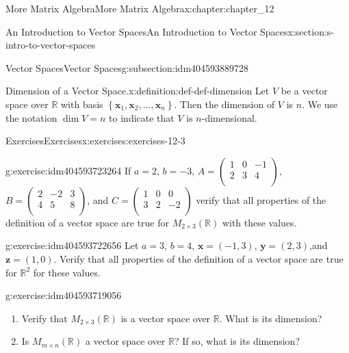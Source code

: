 \documentclass[twoside,10pt,]{book}
\numberwithin{equation}{section}
\renewcommand{\vec}[1]{\mathbf{#1}}
\begin{document}
\begin{chapterptx}{More Matrix Algebra}{}{More Matrix Algebra}{}{}{x:chapter:chapter_12}
\begin{sectionptx}{An Introduction to Vector Spaces}{}{An Introduction to Vector Spaces}{}{}{x:section:s-intro-to-vector-spaces}
\begin{subsectionptx}{Vector Spaces}{}{Vector Spaces}{}{}{g:subsection:idm404593889728}
\begin{definition}{Dimension of a Vector Space.}{x:definition:def-def-dimension}
Let \(V\) be a vector space over \(\mathbb{R}\) with basis \(\left\{\vec{x}_1,\vec{x}_2, \ldots ,\vec{x}_n\right\}\). Then the dimension of \(V\) is \(n\).   We use the notation  \(\dim  V = n\) to indicate that \(V\) is \(n\)-dimensional.%
\end{definition}
\end{subsectionptx}
%
%
\typeout{************************************************}
\typeout{************************************************}
%
\begin{exercises-subsection}{Exercises}{}{Exercises}{}{}{x:exercises:exercises-12-3}
\begin{divisionexercise}{1}{}{}{g:exercise:idm404593723264}%
If \(a = 2\), \(b = -3\), \(A=\left(
\begin{array}{ccc}
1 & 0 & -1 \\
2 & 3 & 4 \\
\end{array}
\right)\),    \(B=\left(
\begin{array}{ccc}
2 & -2 & 3 \\
4 & 5 & 8 \\
\end{array}
\right)\),  and \(C=\left(
\begin{array}{ccc}
1 & 0 & 0 \\
3 & 2 & -2 \\
\end{array}
\right)\) verify that all properties of the definition of a vector space are true for \(M_{2\times 3}(\mathbb{R})\) with these values.%
\end{divisionexercise}%
\begin{divisionexercise}{2}{}{}{g:exercise:idm404593722656}%
Let \(a = 3\), \(b = 4\), \(\vec{x}\pmb = (-1, 3)\), \(\vec{y} = (2, 3)\),and \(\vec{z} = (1, 0)\). Verify that all properties of the definition of a vector space are true for \(\mathbb{R}^2\) for these values.%
\end{divisionexercise}%
\begin{divisionexercise}{3}{}{}{g:exercise:idm404593719056}%
%
\begin{enumerate}[label=(\alph*)]
\item{}Verify that \(M_{2\times 3}(\mathbb{R})\) is a vector space over \(\mathbb{R}\).  What is its dimension?%
\item{}Is \(M_{m\times n}(\mathbb{R})\) a vector space over \(\mathbb{R}\)?  If so, what is its dimension?%
\end{enumerate}
%

\end{divisionexercise}
\end{exercises-subsection}
\end{sectionptx}
\end{chapterptx}
\end{document}
